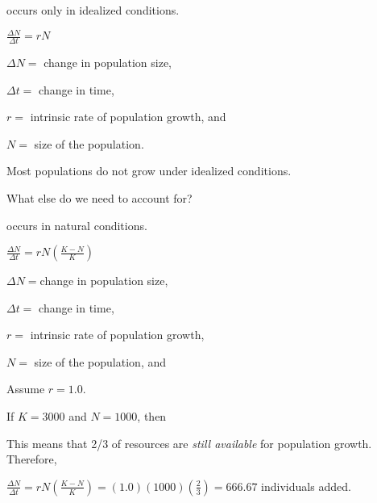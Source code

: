 \documentclass[t,handout]{beamer}  %
\begin{document}
%
\begin{frame}{ occurs only in idealized conditions.}
	\begin{center}
		\Huge $\frac{\Delta N}{\Delta t} = rN$
	\end{center}
	
	\hangpara $\Delta N = $ change in population size,

	\hangpara $\Delta t = $ change in time,
	
	\hangpara $r = $ intrinsic rate of population growth, and
	
	\hangpara $N = $ size of the population.
	
\end{frame}
%
{
\begin{frame}[b]
\end{frame}
}
%
{
\begin{frame}[b]
\end{frame}
}
%
\begin{frame}{}

	\hangpara\Large Most populations do not grow under idealized conditions.
	
	\hangpara\Large What else do we need to account for?
	
	\pause
	\hangpara {}
	
\end{frame}
%
\begin{frame}{ occurs in natural conditions.}
	\begin{center}
		\Huge $\frac{\Delta N}{\Delta t} = rN\left(\frac{K-N}{K}\right)$
	\end{center}
	
	\hangpara $\Delta N = $change in population size,

	\hangpara $\Delta t = $ change in time,
	
	\hangpara $r = $ intrinsic rate of population growth, 
	
	\hangpara $N = $ size of the population, and
	
	\hangpara {}
	
\end{frame}
%
\begin{frame}
	\hangpara Assume $r = 1.0$.
	
	\hangpara If $K = 3000$ and $N = 1000$, \pause then
	
	
	\hangpara This means that 2/3 of resources are \emph{still available} for population growth. \pause Therefore,
	
	\hangpara $\frac{\Delta N}{\Delta t} = rN\left(\frac{K-N}{K}\right) = (1.0)(1000)(\frac{2}{3}) = 666.67$ individuals added.
\end{frame}
\end{document}

